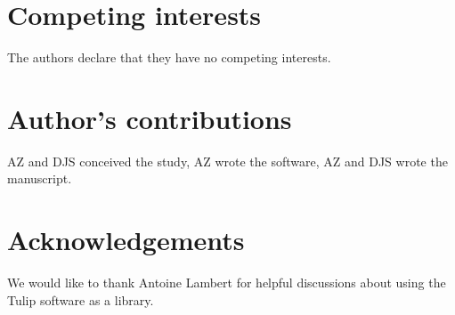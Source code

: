 \documentclass{bmcart}
\begin{document}
\begin{backmatter}

\section*{Competing interests}
The authors declare that they have no competing interests.

\section*{Author's contributions}
AZ and DJS conceived the study, AZ wrote the software, AZ and DJS wrote the manuscript.

\section*{Acknowledgements}
We would like to thank Antoine Lambert for helpful discussions about using the Tulip software as a library.






\end{backmatter}
\end{document}
